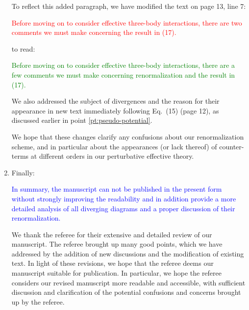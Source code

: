 \documentclass[preprint]{revtex4-1}
\newcommand{\1}{\mathds{1}}
\newcommand{\blue}[1]{\textcolor{blue}{#1}}
\newcommand{\red}[1]{\textcolor{red}{#1}}
\newcommand{\green}[1]{\textcolor{green}{#1}}
\begin{document}
\begin{enumerate}
  To reflect this added paragraph, we have modified the text on page
  13, line 7:

  \red{Before moving on to consider effective three-body interactions,
    there are two comments we must make concerning the result in
    (17).}

  to read:

  \green{Before moving on to consider effective three-body
    interactions, there are a few comments we must make concerning
    renormalization and the result in (17).}

  We also addressed the subject of divergences and the reason for
  their appearance in new text immediately following Eq.~(15) (page
  12), as discussed earlier in point \ref{pt:pseudo-potential}.

  We hope that these changes clarify any confusions about our
  renormalization scheme, and in particular about the appearances (or
  lack thereof) of counter-terms at different orders in our
  perturbative effective theory.


\item Finally:

  \blue{In summary, the manuscript can not be published in the present
    form without strongly improving the readability and in addition
    provide a more detailed analysis of all diverging diagrams and a
    proper discussion of their renormalization.}

  We thank the referee for their extensive and detailed review of our
  manuscript.  The referee brought up many good points, which we have
  addressed by the addition of new discussions and the modification of
  existing text.  In light of these revisions, we hope that the
  referee deems our manuscript suitable for publication.  In
  particular, we hope the referee considers our revised manuscript
  more readable and accessible, with sufficient discussion and
  clarification of the potential confusions and concerns brought up by
  the referee.

\end{enumerate}
\end{document}
